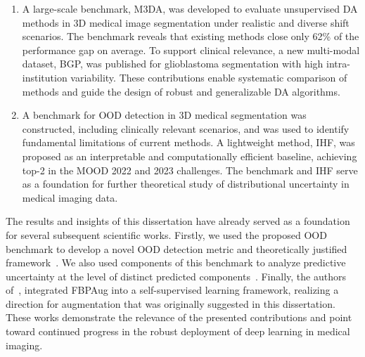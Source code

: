 \begin{enumerate}
    \item A large-scale benchmark, M3DA, was developed to evaluate unsupervised DA methods in 3D medical image segmentation under realistic and diverse shift scenarios. The benchmark reveals that existing methods close only 62\% of the performance gap on average. To support clinical relevance, a new multi-modal dataset, BGP, was published for glioblastoma segmentation with high intra-institution variability. These contributions enable systematic comparison of methods and guide the design of robust and generalizable DA algorithms.
    
    \item A benchmark for OOD detection in 3D medical segmentation was constructed, including clinically relevant scenarios, and was used to identify fundamental limitations of current methods. A lightweight method, IHF, was proposed as an interpretable and computationally efficient baseline, achieving top-2 in the MOOD 2022 and 2023 challenges. The benchmark and IHF serve as a foundation for further theoretical study of distributional uncertainty in medical imaging data.
    
\end{enumerate}

The results and insights of this dissertation have already served as a foundation for several subsequent scientific works. Firstly, we used the proposed OOD benchmark to develop a novel OOD detection metric and theoretically justified framework~\cite{vasiliuk2023redesigning}. We also used components of this benchmark to analyze predictive uncertainty at the level of distinct predicted components~\cite{vasiliuk2022exploring}. Finally, the authors of~\cite{goncharov2023vox2vec}, integrated FBPAug into a self-supervised learning framework, realizing a direction for augmentation that was originally suggested in this dissertation. These works demonstrate the relevance of the presented contributions and point toward continued progress in the robust deployment of deep learning in medical imaging.
